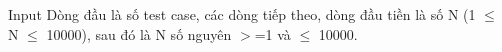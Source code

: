 Input
Dòng đầu là số test case, các dòng tiếp theo, dòng đầu tiền là số N (1 $\le$ N  $\le$ 10000),  sau đó là N số nguyên $>$=1 và   $\le$  10000.